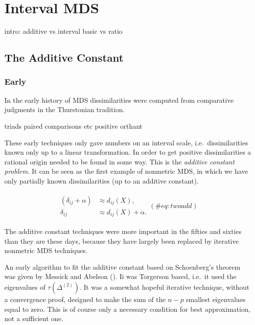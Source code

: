 \documentclass[
  12pt,
  letterpaper,
  DIV=11,
  numbers=noendperiod]{scrreprt}
\theoremstyle{remark}
\begin{document}
\chapter{Interval MDS}\label{intinterval}

intro: additive vs interval basic vs ratio

\section{The Additive Constant}\label{intadditive}

\subsection{Early}\label{early}

In the early history of MDS dissimilarities were computed from
comparative judgments in the Thurstonian tradition.

triads paired comparisons etc positive orthant

These early techniques only gave numbers on an interval scale,
i.e.~dissimilarities known only up to a linear transformation. In order
to get positive dissimilarities a rational origin needed to be found in
some way. This is the \emph{additive constant problem}. It can be seen
as the first example of nonmetric MDS, in which we have only partially
known dissimilarities (up to an additive constant).

\begin{align}
\begin{split}
(\delta_{ij}+\alpha)&\approx d_{ij}(X),\\
\delta_{ij}&\approx d_{ij}(X)+\alpha.
\end{split}
(\#eq:twoadd)
\end{align}

The additive constant techniques were more important in the fifties and
sixties than they are these days, because they have largely been
replaced by iterative nonmetric MDS techniques.

An early algorithm to fit the additive constant based on Schoenberg's
theorem was given by Messick and Abelson
(). Ii was Torgerson based,
i.e.~it used the eigenvalues of \(\tau(\Delta^{(2)})\). It was a
somewhat hopeful iterative technique, without a convergence proof,
designed to make the sum of the \(n-p\) smallest eigenvalues equal to
zero. This is of course only a necessary condition for best
approximation, not a sufficient one.
\end{document}
